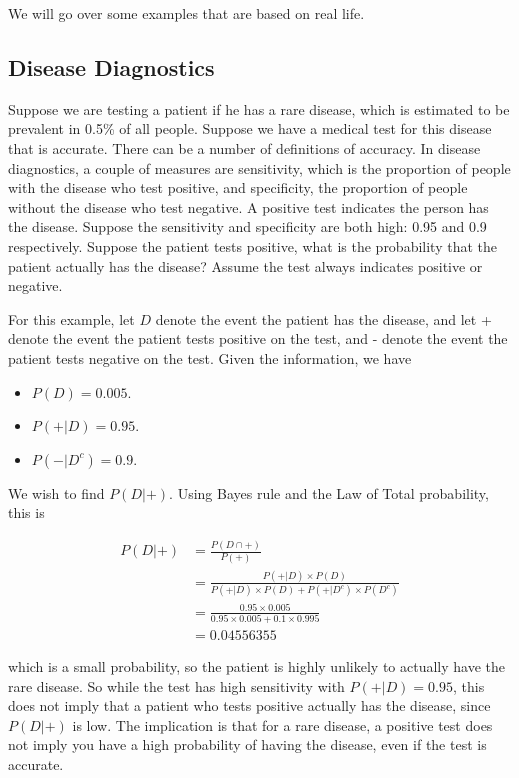 \documentclass[
]{book}
\providecommand{\tightlist}{%
  \setlength{\itemsep}{0pt}\setlength{\parskip}{0pt}}
\begin{document}
We will go over some examples that are based on real life.

\subsection{Disease Diagnostics}\label{disease-diagnostics}

Suppose we are testing a patient if he has a rare disease, which is estimated to be prevalent in 0.5\% of all people. Suppose we have a medical test for this disease that is accurate. There can be a number of definitions of accuracy. In disease diagnostics, a couple of measures are sensitivity, which is the proportion of people with the disease who test positive, and specificity, the proportion of people without the disease who test negative. A positive test indicates the person has the disease. Suppose the sensitivity and specificity are both high: 0.95 and 0.9 respectively. Suppose the patient tests positive, what is the probability that the patient actually has the disease? Assume the test always indicates positive or negative.

For this example, let \(D\) denote the event the patient has the disease, and let + denote the event the patient tests positive on the test, and - denote the event the patient tests negative on the test. Given the information, we have

\begin{itemize}
\tightlist
\item
  \(P(D) = 0.005\).
\item
  \(P(+|D) = 0.95\).
\item
  \(P(-|D^c) = 0.9\).
\end{itemize}

We wish to find \(P(D|+)\). Using Bayes rule and the Law of Total probability, this is

\[
\begin{split}
P(D|+) &= \frac{P(D \cap +)}{P(+)}\\
 &= \frac{P(+|D) \times P(D)}{P(+|D) \times P(D) + P(+|D^c) \times P(D^c)} \\
&= \frac{0.95 \times 0.005}{0.95 \times 0.005 + 0.1 \times 0.995 }\\
&= 0.04556355
\end{split}
\]

which is a small probability, so the patient is highly unlikely to actually have the rare disease. So while the test has high sensitivity with \(P(+|D) = 0.95\), this does not imply that a patient who tests positive actually has the disease, since \(P(D|+)\) is low. The implication is that for a rare disease, a positive test does not imply you have a high probability of having the disease, even if the test is accurate.
\end{document}
